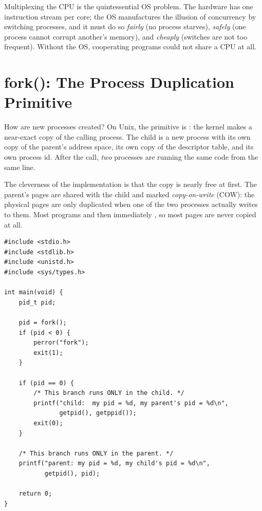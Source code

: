 \begin{osconcept}
Multiplexing the CPU is the quintessential OS problem. The hardware has
one instruction stream per core; the OS manufactures the illusion of
concurrency by switching processes, and it must do so \emph{fairly}
(no process starves), \emph{safely} (one process cannot corrupt
another's memory), and \emph{cheaply} (switches are not too frequent).
Without the OS, cooperating programs could not share a CPU at all.
\end{osconcept}

\section{fork(): The Process Duplication Primitive}

How are new processes created? On Unix, the primitive is :
the kernel makes a near-exact copy of the calling process. The child is
a new process with its own copy of the parent's address space, its own
copy of the descriptor table, and its own process id. After the call,
\emph{two} processes are running the same code from the same line.

The cleverness of the implementation is that the copy is nearly free at
first. The parent's pages are shared with the child and marked
\emph{copy-on-write} (COW): the physical pages are only duplicated when
one of the two processes actually writes to them. Most programs
 and then immediately , so most pages are never
copied at all.

\begin{lstlisting}[caption={fork returns twice: once in each process.}]
#include <stdio.h>
#include <stdlib.h>
#include <unistd.h>
#include <sys/types.h>

int main(void) {
    pid_t pid;

    pid = fork();
    if (pid < 0) {
        perror("fork");
        exit(1);
    }

    if (pid == 0) {
        /* This branch runs ONLY in the child. */
        printf("child:  my pid = %d, my parent's pid = %d\n",
               getpid(), getppid());
        exit(0);
    }

    /* This branch runs ONLY in the parent. */
    printf("parent: my pid = %d, my child's pid = %d\n",
           getpid(), pid);

    return 0;
}
\end{lstlisting}


